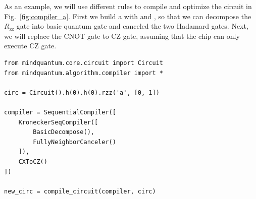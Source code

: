 As an example, we will use different rules to compile and optimize the circuit in Fig.~\ref{fig:compiler_a}. First we build a \KroneckerSeqCompiler with \BasicDecompose and \FullyNeighborCanceler, so that we can decompose the $R_\text{zz}$ gate into basic quantum gate and canceled the two Hadamard gates. Next, we will replace the CNOT gate to CZ gate, assuming that the chip can only execute CZ gate.
\begin{lstlisting}
from mindquantum.core.circuit import Circuit
from mindquantum.algorithm.compiler import *

circ = Circuit().h(0).h(0).rzz('a', [0, 1])

compiler = SequentialCompiler([
    KroneckerSeqCompiler([
        BasicDecompose(),
        FullyNeighborCanceler()
    ]),
    CXToCZ()
])

new_circ = compile_circuit(compiler, circ)
\end{lstlisting}
